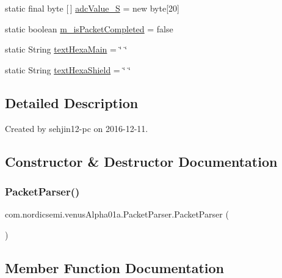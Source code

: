 \begin{DoxyCompactItemize}
static final byte \mbox{[}$\,$\mbox{]} \hyperlink{classcom_1_1nordicsemi_1_1venus_alpha01a_1_1_packet_parser_a313291b4a7d80efa5e2f7047d68fe253}{adc\+Value\+\_\+S} = new byte\mbox{[}20\mbox{]}
\item 
static boolean \hyperlink{classcom_1_1nordicsemi_1_1venus_alpha01a_1_1_packet_parser_a44cfe8a4e0f3956dc95e0bf6314365a4}{m\+\_\+is\+Packet\+Completed} = false
\item 
static String \hyperlink{classcom_1_1nordicsemi_1_1venus_alpha01a_1_1_packet_parser_abb442115fc7f03a5bbad4036e89ad072}{text\+Hexa\+Main} = \char`\"{} \char`\"{}
\item 
static String \hyperlink{classcom_1_1nordicsemi_1_1venus_alpha01a_1_1_packet_parser_a954331deb6f3c9b2c7fb9d584cee544b}{text\+Hexa\+Shield} = \char`\"{} \char`\"{}
\end{DoxyCompactItemize}


\subsection{Detailed Description}
Created by sehjin12-\/pc on 2016-\/12-\/11. 

\subsection{Constructor \& Destructor Documentation}
\mbox{\label{classcom_1_1nordicsemi_1_1venus_alpha01a_1_1_packet_parser_a7015e53211f8c9c9e167a844ad65337d}} 
\subsubsection{\texorpdfstring{Packet\+Parser()}{PacketParser()}}
{\footnotesize\ttfamily com.\+nordicsemi.\+venus\+Alpha01a.\+Packet\+Parser.\+Packet\+Parser (\begin{DoxyParamCaption}{ }\end{DoxyParamCaption})}



\subsection{Member Function Documentation}
\mbox{\label{classcom_1_1nordicsemi_1_1venus_alpha01a_1_1_packet_parser_a24347083c8e46d2752850c037bd6b423}} 
